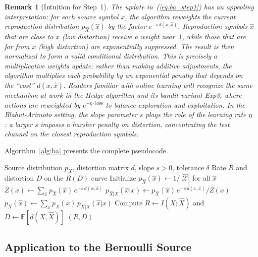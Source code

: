 \documentclass[11pt]{article}
\newtheorem{remark}{Remark}[section]
\newcommand{\RD}{R(D)}
\newcommand{\E}{\mathbb{E}}
\newcommand{\calX}{\mathcal{X}}
\newcommand{\calXhat}{\hat{\mathcal{X}}}
\begin{document}
\begin{remark}[Intuition for Step~1]
The update in~(\ref{eq:ba_step1}) has an appealing interpretation: for each source
symbol $x$, the algorithm reweights the current reproduction distribution
$p_{\hat{X}}(\hat{x})$ by the factor $e^{-s\,d(x,\hat{x})}$.
Reproduction symbols $\hat{x}$ that are close to $x$ (low distortion) receive a
weight near~$1$, while those that are far from $x$ (high distortion) are
exponentially suppressed.
The result is then normalized to form a valid conditional distribution.
This is precisely a \emph{multiplicative weights update}: rather than making
additive adjustments, the algorithm multiplies each probability by an
exponential penalty that depends on the ``cost'' $d(x,\hat{x})$.
Readers familiar with online learning will recognize the same mechanism at work
in the Hedge algorithm and its bandit variant Exp3, where actions are reweighted
by $e^{-\eta \cdot \text{loss}}$ to balance exploration and exploitation.
In the Blahut-Arimoto setting, the slope parameter $s$ plays the role of the
learning rate $\eta$: a larger $s$ imposes a harsher penalty on distortion,
concentrating the test channel on the closest reproduction symbols.
\end{remark}

Algorithm~\ref{alg:ba} presents the complete pseudocode.

\begin{algorithm}[t]
\caption{Blahut-Arimoto Algorithm}
\label{alg:ba}
\begin{algorithmic}[1]
\Require Source distribution $p_X$, distortion matrix $d$, slope $s > 0$, tolerance $\delta$
\Ensure Rate $R$ and distortion $D$ on the $\RD$ curve
\State Initialize $p_{\hat{X}}(\hat{x}) \gets 1/|\calXhat|$ for all $\hat{x}$
\Repeat
    \For{each $x \in \calX$}
        \State $Z(x) \gets \sum_{\hat{x}} p_{\hat{X}}(\hat{x})\, e^{-s\, d(x,\hat{x})}$
        \For{each $\hat{x} \in \calXhat$}
            \State $p_{\hat{X}|X}(\hat{x}|x) \gets p_{\hat{X}}(\hat{x})\, e^{-s\, d(x,\hat{x})} / Z(x)$
        \EndFor
    \EndFor
    \For{each $\hat{x} \in \calXhat$}
        \State $p_{\hat{X}}(\hat{x}) \gets \sum_{x} p_X(x)\, p_{\hat{X}|X}(\hat{x}|x)$
    \EndFor
    \State Compute $R \gets I(X; \hat{X})$ and $D \gets \E[d(X,\hat{X})]$
\State \Return $(R, D)$
\end{algorithmic}
\end{algorithm}

\subsection{Application to the Bernoulli Source}
\label{subsec:ba_bernoulli}
\end{document}
